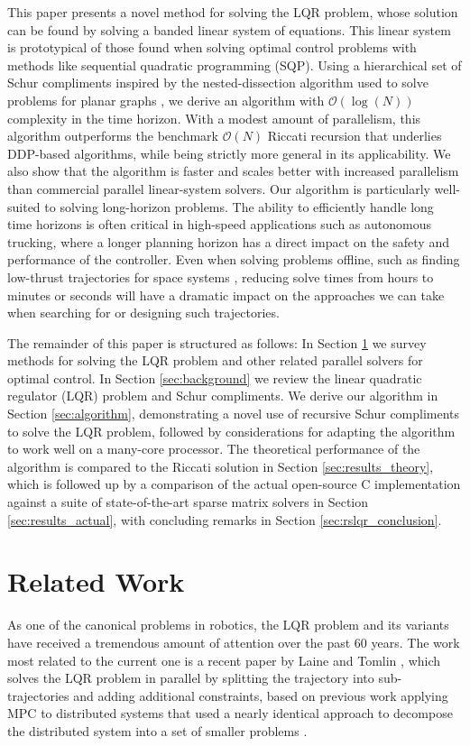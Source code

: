 \documentclass[../root.tex]{subfiles}
\newcommand{\0}{{\transparent{0} \resizebox{\mycellheight}{\mycellheight}{0}}}
\begin{document}
This paper presents a novel method for solving the LQR problem, whose solution can be found 
by solving a banded linear system of equations. This linear system is prototypical of those 
found when solving optimal control problems with methods like sequential quadratic
programming (SQP). Using a hierarchical set of Schur compliments inspired by the
nested-dissection algorithm used to solve problems for planar graphs
\cite{george_Nested_1973,khaira_Nested_}, we derive an algorithm with $\mathcal{O}(\log(N))$
complexity in the time horizon. With a modest amount of parallelism, this algorithm
outperforms the benchmark $\mathcal{O}(N)$ Riccati recursion that underlies DDP-based
algorithms, while being strictly more general in its applicability. We also show that the
algorithm is faster and scales better with increased parallelism than commercial parallel
linear-system solvers. Our algorithm is particularly well-suited to solving long-horizon
problems. The ability to efficiently handle long time horizons is often critical in
high-speed applications such as autonomous trucking, where a longer planning horizon has a
direct impact on the safety and performance of the controller. Even when solving problems
offline, such as finding low-thrust trajectories for space systems
\cite{tracy_LowThrust_2021}, reducing solve times from hours to minutes or seconds will have a
dramatic impact on the approaches we can take when searching for or designing such
trajectories. 

The remainder of this paper is structured as
follows: In Section \ref{sec:related_work} we survey methods for solving the LQR problem and
other related parallel solvers for optimal control. In Section \ref{sec:background} we 
review the linear quadratic regulator (LQR) problem and Schur compliments. We derive our 
algorithm in Section \ref{sec:algorithm}, demonstrating a novel use of recursive
Schur compliments to solve the LQR problem, followed by considerations for adapting the 
algorithm to work well on a many-core processor. The theoretical performance of the 
algorithm is compared to the Riccati solution in Section \ref{sec:results_theory}, which is 
followed up by a comparison of the actual open-source C implementation against
a suite of state-of-the-art sparse matrix solvers in Section \ref{sec:results_actual}, with 
concluding remarks in Section \ref{sec:rslqr_conclusion}.

\section{Related Work} \label{sec:related_work}
As one of the canonical problems in robotics, the LQR problem and its variants have received
a tremendous amount of attention over the past 60 years. The work most related to the
current one is a recent paper by Laine and Tomlin \cite{laine_Parallelizing_2019}, which
solves the LQR problem in parallel by splitting the trajectory into sub-trajectories and
adding additional constraints, based on previous work applying MPC to distributed systems
that used a nearly identical approach to decompose the distributed system into a set of
smaller problems \cite{soudbakhsh_Parallelized_2013}.
\end{document}

